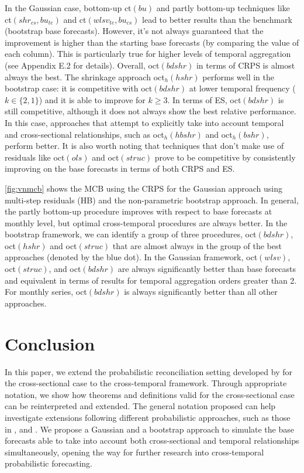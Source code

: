 \documentclass[a4paper,11pt]{article}
\theoremstyle{definition}
\begin{document}
In the Gaussian case, bottom-up ct$(bu)$ and partly bottom-up techniques like ct$(shr_{cs}, bu_{te})$ and ct$(wlsv_{te}, bu_{cs})$ lead to better results than the benchmark (bootstrap base forecasts). However, it's not always guaranteed that the improvement is higher than the starting base forecasts (by comparing the value of each column). This is particularly true for higher levels of temporal aggregation (see Appendix E.2 for details). Overall, oct$(bdshr)$ in terms of CRPS is almost always the best. The shrinkage approach oct$_h(hshr)$ performs well in the bootstrap case: it is competitive with oct$(bdshr)$ at lower temporal frequency ($k \in \{2,1\}$) and it is able to improve for $k\ge 3$. In terms of ES, oct$(bdshr)$ is still competitive, although it does not always show the best relative performance. In this case, approaches that attempt to explicitly take into account temporal and cross-sectional relationships, such as oct$_h(hbshr)$ and oct$_h(bshr)$, perform better. It is also worth noting that techniques that don't make use of residuals like oct$(ols)$ and oct$(struc)$ prove to be competitive by consistently improving on the base forecasts in terms of both CRPS and ES.

\autoref{fig:vnmcb} shows the MCB using the CRPS for the Gaussian approach using multi-step residuals (HB) and the non-parametric bootstrap approach. In general, the partly bottom-up procedure improves with respect to base forecasts at monthly level, but optimal cross-temporal procedures are always better. In the bootstrap framework, we can identify a group of three procedures, oct$(bdshr)$, oct$(hshr)$ and oct$(struc)$ that are almost always in the group of the best approaches (denoted by the blue dot). In the Gaussian framework, oct$(wlsv)$, oct$(struc)$, and oct$(bdshr)$ are always significantly better than base forecasts and equivalent in terms of results for temporal aggregation orders greater than 2. For monthly series, oct$(bdshr)$ is always significantly better than all other approaches.

\section{Conclusion}\label{sec:conclusion}

In this paper, we extend the probabilistic reconciliation setting developed by \cite{panagiotelis2023} for the cross-sectional case to the cross-temporal framework. Through appropriate notation, we show how theorems and definitions valid for the cross-sectional case can be reinterpreted and extended. The general notation proposed can help investigate extensions following different probabilistic approaches, such as those in \cite{jeon2019}, \cite{bentaieb2021} and \cite{corani2022}. We propose a Gaussian and a bootstrap approach to simulate the base forecasts able to take into account both cross-sectional and temporal relationships simultaneously, opening the way for further research into  cross-temporal probabilistic forecasting.
\end{document}
